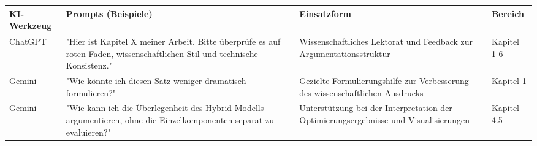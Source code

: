 
\begin{tabularx}{\textwidth}{|X|X|X|X|}
        \hline
        \textbf{KI-Werkzeug} & \textbf{Prompts (Beispiele)} & \textbf{Einsatzform} & \textbf{Bereich} \\
        \hline \hline
        
        ChatGPT & "Hier ist Kapitel X meiner Arbeit. Bitte überprüfe es auf roten Faden, wissenschaftlichen Stil und technische Konsistenz." & Wissenschaftliches Lektorat und Feedback zur Argumentationsstruktur & Kapitel 1-6 \\
        \hline

        Gemini & "Wie könnte ich diesen Satz weniger dramatisch formulieren?" & Gezielte Formulierungshilfe zur Verbesserung des wissenschaftlichen Ausdrucks & Kapitel 1 \\
        \hline

        Gemini & "Wie kann ich die Überlegenheit des Hybrid-Modells argumentieren, ohne die Einzelkomponenten separat zu evaluieren?" & Unterstützung bei der Interpretation der Optimierungsergebnisse und Visualisierungen & Kapitel 4.5 \\
        \hline
\end{tabularx}